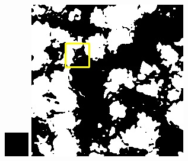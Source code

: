 \documentclass[UTF8]{ctexart}
\begin{document}
\begin{figure}[H]
{\begin{minipage}[b]{0.15\linewidth}
            \includegraphics[width=1\linewidth]{../log/spoon2/cut/tmp_cut_LC81321192014054LGN00_03055_unet.jpg}\vspace{4pt}
            \includegraphics[width=1\linewidth]{../log/spoon2/cut/LC80350192014190LGN00_06561_unet.jpg}\vspace{4pt}

\end{minipage}}
\end{figure}
\end{document}
